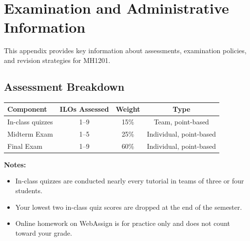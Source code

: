 
\section{Examination and Administrative Information}


This appendix provides key information about assessments, examination policies, and revision strategies for MH1201.


\subsection{Assessment Breakdown}


\begin{center}

\begin{tabular}{|l|c|c|c|}

\hline

\textbf{Component} & \textbf{ILOs Assessed} & \textbf{Weight} & \textbf{Type} \\

\hline

In-class quizzes & 1--9 & 15\% & Team, point-based \\

\hline

Midterm Exam & 1--5 & 25\% & Individual, point-based \\

\hline

Final Exam & 1--9 & 60\% & Individual, point-based \\

\hline

\end{tabular}

\end{center}

\vspace{0.3cm}

\noindent

\textbf{Notes:}

\begin{itemize}

\item In-class quizzes are conducted nearly every tutorial in teams of three or four students.

\item Your lowest two in-class quiz scores are dropped at the end of the semester.

\item Online homework on WebAssign is for practice only and does not count toward your grade.

\end{itemize}

